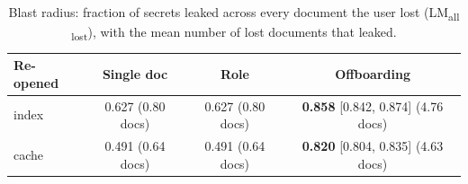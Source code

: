 \begin{table}[tbp]
\centering
\footnotesize
\setlength{\tabcolsep}{3pt}
\caption{Blast radius: fraction of secrets leaked across every document the user lost
(LM\textsubscript{all lost}), with the mean number of lost documents that leaked.}
\label{tab:blast}
\begin{tabular}{lccc}
\toprule
Re-opened & Single doc & Role & Offboarding \\
\midrule
index & 0.627 (0.80 docs) & 0.627 (0.80 docs) & \textbf{0.858} [0.842, 0.874] (4.76 docs) \\
cache & 0.491 (0.64 docs) & 0.491 (0.64 docs) & \textbf{0.820} [0.804, 0.835] (4.63 docs) \\
\bottomrule
\end{tabular}
\end{table}
